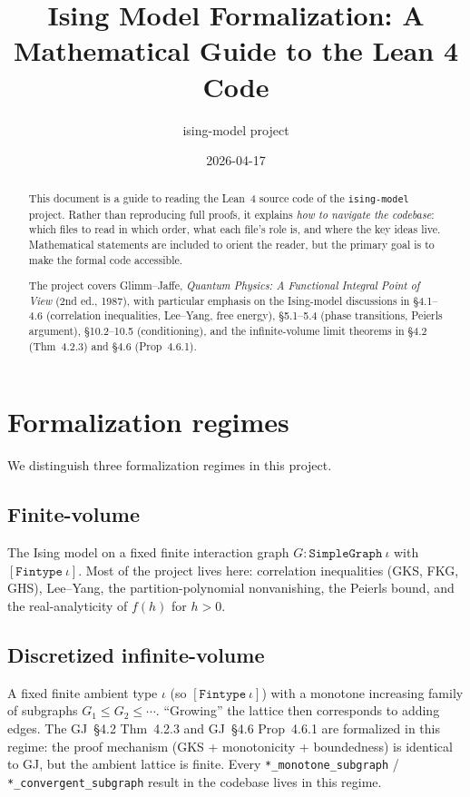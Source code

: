 \documentclass[a4paper,11pt]{article}
\title{Ising Model Formalization: A Mathematical Guide to the Lean 4 Code}
\author{ising-model project}
\date{2026-04-17}
\begin{document}
\maketitle

\begin{abstract}
This document is a guide to reading the Lean~4 source code of the
\texttt{ising-model} project. Rather than reproducing full proofs,
it explains \emph{how to navigate the codebase}: which files to read
in which order, what each file's role is, and where the key ideas live.
Mathematical statements are included to orient the reader, but the
primary goal is to make the formal code accessible.

The project covers Glimm--Jaffe, \emph{Quantum Physics: A Functional
Integral Point of View} (2nd ed., 1987), with particular emphasis on
the Ising-model discussions in \S4.1--4.6 (correlation inequalities,
Lee--Yang, free energy), \S5.1--5.4 (phase transitions, Peierls
argument), \S10.2--10.5 (conditioning), and the infinite-volume limit
theorems in \S4.2 (Thm~4.2.3) and \S4.6 (Prop~4.6.1).
\end{abstract}

\tableofcontents

\section{Formalization regimes}

We distinguish three formalization regimes in this project.

\subsection{Finite-volume}

The Ising model on a fixed finite interaction graph
$G : \texttt{SimpleGraph}~\iota$ with $[\texttt{Fintype}~\iota]$.
Most of the project lives here: correlation inequalities (GKS, FKG,
GHS), Lee--Yang, the partition-polynomial nonvanishing, the Peierls
bound, and the real-analyticity of $f(h)$ for $h > 0$.

\subsection{Discretized infinite-volume}

A fixed finite ambient type $\iota$ (so $[\texttt{Fintype}~\iota]$)
with a monotone increasing family of subgraphs $G_1 \le G_2 \le \cdots$.
``Growing'' the lattice then corresponds to adding edges.  The
GJ~\S4.2 Thm~4.2.3 and GJ~\S4.6 Prop~4.6.1 are formalized in this
regime: the proof mechanism (GKS + monotonicity + boundedness) is
identical to GJ, but the ambient lattice is finite.  Every
\texttt{*\_monotone\_subgraph} / \texttt{*\_convergent\_subgraph}
result in the codebase lives in this regime.
\end{document}
